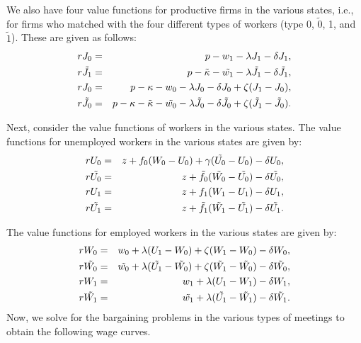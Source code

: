 \documentclass[12pt]{article} %
\theoremstyle{definition}
\begin{document}
We also have four value functions for productive firms in the various states, i.e., for firms who matched with the four different types of workers (type 0, $\tilde{0}$, 1, and $\tilde{1}$). These are given as follows:
\begin{eqnarray}
    rJ_0 &=& p - w_1 - \lambda J_1 - \delta J_1, \\
    r\Tilde{J_1} &=& p - \Tilde{\kappa} - \Tilde{w_1} - \lambda \Tilde{J_1} - \delta \Tilde{J_1}, \\
    rJ_0 &=& p - \kappa - w_0 - \lambda J_0 - \delta J_0 + \zeta (J_1-J_0), \\
    r\Tilde{J_0} &=& p - \kappa - \Tilde{\kappa} - \Tilde{w_0} - \lambda \Tilde{J_0} - \delta \Tilde{J_0} + \zeta (\Tilde{J_1}-\Tilde{J_0}).
\end{eqnarray}

Next, consider the value functions of workers in the various states. The value functions for unemployed workers in the various states are given by:
\begin{eqnarray}
    rU_0 &=& z + f_0 (W_0 - U_0) + \gamma (\Tilde{U_0} - U_0) - \delta U_0, \\
    r\Tilde{U_0} &=& z + \Tilde{f_0} (\Tilde{W_0} - \Tilde{U_0}) - \delta \Tilde{U_0}, \\
    rU_1 &=& z + f_1 (W_1 - U_1) - \delta U_1, \\
    r\Tilde{U_1} &=& z + \Tilde{f_1} (\Tilde{W_1} - \Tilde{U_1}) - \delta \Tilde{U_1}.
\end{eqnarray}

The value functions for employed workers in the various states are given by:
\begin{eqnarray}
    rW_0 &=& w_0 + \lambda (U_1 - W_0) + \zeta(W_1-W_0) - \delta W_0 , \\
    r\Tilde{W_0} &=& \Tilde{w_0} + \lambda (\Tilde{U_1} - \Tilde{W_0}) + \zeta(\Tilde{W_1}-\Tilde{W_0}) - \delta \Tilde{W_0}, \\
    rW_1 &=& w_1 + \lambda (U_1 - W_1)-\delta W_1, \\
    r\Tilde{W_1} &=& \Tilde{w_1} + \lambda (\Tilde{U_1} - \Tilde{W_1}) -\delta \Tilde{W_1}.
\end{eqnarray}
Now, we solve for the bargaining problems in the various types of meetings to obtain the following wage curves.
\end{document}
